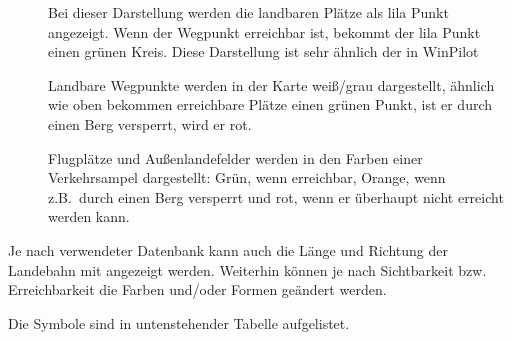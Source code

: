 \begin{description}
   \item[] Bei dieser Darstellung werden die landbaren Plätze als lila Punkt angezeigt. Wenn der Wegpunkt erreichbar ist, bekommt der lila Punkt einen grünen Kreis.  Diese Darstellung ist sehr ähnlich der in WinPilot
   \item[]  Landbare Wegpunkte werden in der Karte weiß/grau dargestellt, ähnlich wie oben bekommen erreichbare Plätze einen grünen Punkt, ist er durch einen Berg versperrt, wird er rot. 
   \item[] Flugplätze und Außenlandefelder werden in den Farben einer Verkehrsampel dargestellt: Grün, wenn erreichbar, Orange, wenn z.B.\ durch einen Berg versperrt und rot, wenn er überhaupt nicht erreicht werden kann.
\end{description}

\tip Je nach verwendeter Datenbank kann auch die Länge und Richtung der Landebahn mit angezeigt werden. 
Weiterhin können je nach Sichtbarkeit bzw. Erreichbarkeit die Farben und/oder Formen geändert werden.

Die Symbole sind in untenstehender Tabelle aufgelistet. 

